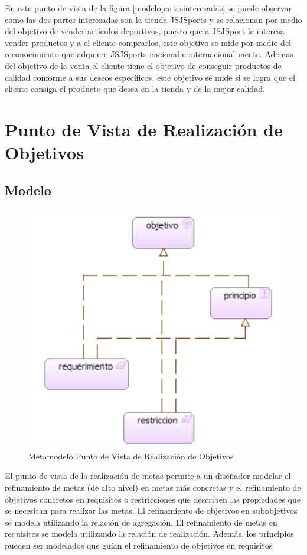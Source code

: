 En  este punto de vista de la figura \ref{modelopartesinteresadas} se puede observar como las dos partes interesadas son la tienda JSJSports y se relacionan por medio del objetivo de vender artículos deportivos, puesto que a JSJSport le interesa vender productos y a el cliente comprarlos, este objetivo se mide por medio del reconocimiento que adquiere JSJSports nacional e internacional mente.\newline
Ademas del objetivo de la venta el cliente tiene el objetivo de conseguir productos de calidad conforme a sus deseos específicos, este objetivo se mide si se logra que el cliente consiga el producto que desea en la tienda y de la mejor calidad.


\newpage

\section{Punto de Vista de Realización de Objetivos}

\subsection{Modelo}

\begin{figure}[th!]
	\centering
	\includegraphics[width=0.4\linewidth]{arquitectura/imagenes/modeloRealizacionObjetivos}
	\caption{Metamodelo Punto de Vista de Realización de Objetivos}
	\label{metamodelo realizacion objetivos}
\end{figure}
El punto de vista de la realización de metas permite a un diseñador modelar el refinamiento de metas (de alto nivel) en metas más concretas y el refinamiento de objetivos concretos en requisitos o restricciones que describen las propiedades que se necesitan para realizar las metas. El refinamiento de objetivos en subobjetivos se modela utilizando la relación de agregación. El refinamiento de metas en requisitos se modela utilizando la relación de realización.
Además, los principios pueden ser modelados que guían el refinamiento de objetivos en requisitos

